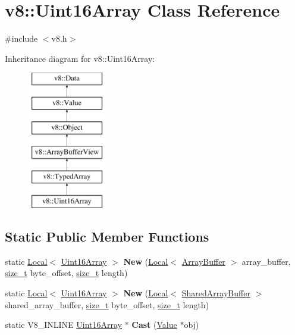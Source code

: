 \hypertarget{classv8_1_1Uint16Array}{}\section{v8\+:\+:Uint16\+Array Class Reference}
\label{classv8_1_1Uint16Array}


{\ttfamily \#include $<$v8.\+h$>$}

Inheritance diagram for v8\+:\+:Uint16\+Array\+:\begin{figure}[H]
\begin{center}
\leavevmode
\includegraphics[height=6.000000cm]{classv8_1_1Uint16Array}
\end{center}
\end{figure}
\subsection*{Static Public Member Functions}
\begin{DoxyCompactItemize}
\item 
\mbox{\label{classv8_1_1Uint16Array_aa0aafae1f5a8ce1267174391c699bd20}} 
static \mbox{\hyperlink{classv8_1_1Local}{Local}}$<$ \mbox{\hyperlink{classv8_1_1Uint16Array}{Uint16\+Array}} $>$ {\bfseries New} (\mbox{\hyperlink{classv8_1_1Local}{Local}}$<$ \mbox{\hyperlink{classv8_1_1ArrayBuffer}{Array\+Buffer}} $>$ array\+\_\+buffer, \mbox{\hyperlink{classsize__t}{size\+\_\+t}} byte\+\_\+offset, \mbox{\hyperlink{classsize__t}{size\+\_\+t}} length)
\item 
\mbox{\label{classv8_1_1Uint16Array_a2e3f82cf34b770742b2ca8d7486573e2}} 
static \mbox{\hyperlink{classv8_1_1Local}{Local}}$<$ \mbox{\hyperlink{classv8_1_1Uint16Array}{Uint16\+Array}} $>$ {\bfseries New} (\mbox{\hyperlink{classv8_1_1Local}{Local}}$<$ \mbox{\hyperlink{classv8_1_1SharedArrayBuffer}{Shared\+Array\+Buffer}} $>$ shared\+\_\+array\+\_\+buffer, \mbox{\hyperlink{classsize__t}{size\+\_\+t}} byte\+\_\+offset, \mbox{\hyperlink{classsize__t}{size\+\_\+t}} length)
\item 
\mbox{\label{classv8_1_1Uint16Array_a84b017960621903a00ef2d912233ce34}} 
static V8\+\_\+\+I\+N\+L\+I\+NE \mbox{\hyperlink{classv8_1_1Uint16Array}{Uint16\+Array}} $\ast$ {\bfseries Cast} (\mbox{\hyperlink{classv8_1_1Value}{Value}} $\ast$obj)
\end{DoxyCompactItemize}
